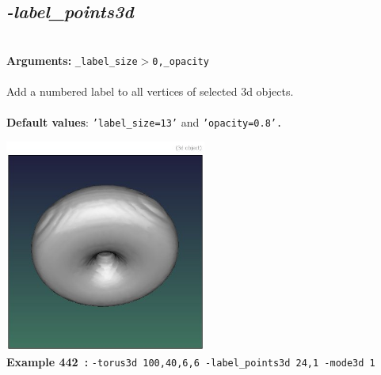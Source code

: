 \documentclass[a4paper,11pt,twoside]{book}
\begin{document}
\subsection{\emph{-label\_points3d} }\vspace*{-0.5em}
~\\\textbf{Arguments: } 
{\small \texttt{\_label\_size$>$0,\_opacity}}\\~\\
Add a numbered label to all vertices of selected 3d objects.
~\\~\\\textbf{Default values}: {\small \texttt{'label\_size=13'} and \texttt{'opacity=0.8'.}}
\begin{center}\includegraphics[keepaspectratio=true,height=7cm,width=\textwidth]{img/gmic_def442.jpg}\\
{\footnotesize \textbf{Example 442~:} \texttt{-torus3d 100,40,6,6 -label\_points3d 24,1 -mode3d 1}}
\end{center}
\end{document}
